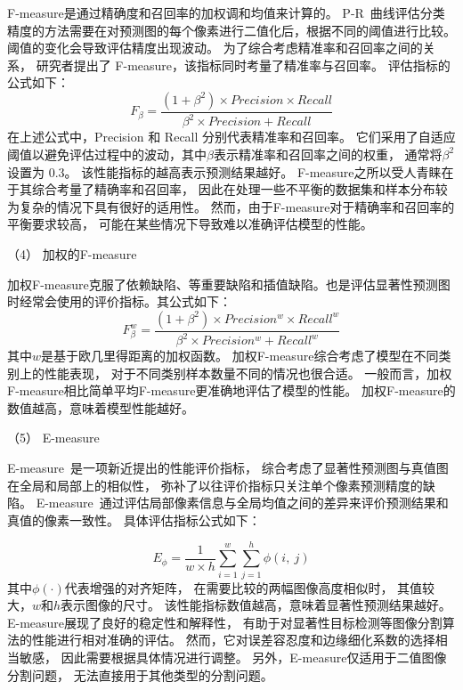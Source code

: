 F-measure是通过精确度和召回率的加权调和均值来计算的。
P-R~曲线评估分类精度的方法需要在对预测图的每个像素进行二值化后，根据不同的阈值进行比较。
阈值的变化会导致评估精度出现波动。
为了综合考虑精准率和召回率之间的关系，
研究者提出了 F-measure，该指标同时考量了精准率与召回率。
评估指标的公式如下：
%
%
\begin{equation}
	F_{\beta} = \frac{\left ( 1 + \beta^{2} \right ) \times Precision \times Recall }{\beta^{2} \times Precision + Recall } 
\end{equation}
%
%
在上述公式中，Precision 和 Recall 分别代表精准率和召回率。
它们采用了自适应阈值以避免评估过程中的波动，其中$\beta$表示精准率和召回率之间的权重，
通常将$\beta^{2}$设置为 0.3。
该性能指标的越高表示预测结果越好。
F-measure之所以受人青睐在于其综合考量了精确率和召回率，
因此在处理一些不平衡的数据集和样本分布较为复杂的情况下具有很好的适用性。
然而，由于F-measure对于精确率和召回率的平衡要求较高，
可能在某些情况下导致难以准确评估模型的性能。






（4）
加权的F-measure\par
%
%
加权F-measure克服了依赖缺陷、等重要缺陷和插值缺陷\cite{margolin2014evaluate}。也是评估显著性预测图时经常会使用的评价指标。其公式如下：
\begin{equation}
	F_{\beta}^{w} = \frac{\left ( 1 + \beta^{2} \right ) \times Precision^{w}  \times Recall^{w} }{\beta^{2} \times Precision^{w} + Recall^{w} } 
\end{equation}
%
%
其中$w$是基于欧几里得距离的加权函数。
加权F-measure综合考虑了模型在不同类别上的性能表现，
对于不同类别样本数量不同的情况也很合适。
一般而言，加权F-measure相比简单平均F-measure更准确地评估了模型的性能。
加权F-measure的数值越高，意味着模型性能越好。







（5）
E-measure\par
%
%
E-measure~是一项新近提出的性能评价指标，
综合考虑了显著性预测图与真值图在全局和局部上的相似性，
弥补了以往评价指标只关注单个像素预测精度的缺陷。
E-measure~通过评估局部像素信息与全局均值之间的差异来评价预测结果和真值的像素一致性。
具体评估指标公式如下：

\begin{equation}
	E_{\phi } = \frac{1}{w \times h} \sum_{i=1}^{w} \sum_{j=1}^{h} \phi\left ( i,~j \right ) 
\end{equation}
%
%
%
%
其中$\phi\left (\cdot \right ) $代表增强的对齐矩阵，
在需要比较的两幅图像高度相似时，
其值较大，$w$和$h$表示图像的尺寸。
该性能指标数值越高，意味着显著性预测结果越好。
E-measure展现了良好的稳定性和解释性，
有助于对显著性目标检测等图像分割算法的性能进行相对准确的评估。
然而，它对误差容忍度和边缘细化系数的选择相当敏感，
因此需要根据具体情况进行调整。
另外，E-measure仅适用于二值图像分割问题，
无法直接用于其他类型的分割问题。



